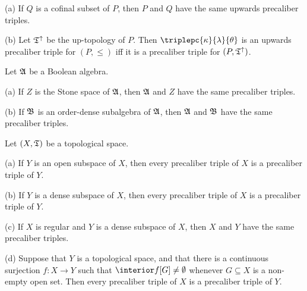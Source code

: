 (a) If $Q$ is a cofinal subset of $P$, then $P$ and $Q$ have the same
upwards precaliber triples.

(b) Let $\frak T^{\uparrow}$ be the up-topology of
$P$.    Then
$\triplepc{\kappa}{\lambda}{\theta}$ is an upwards precaliber triple for
$(P,\le)$ iff it is a precaliber triple for $(P,\frak T^{\uparrow})$.


 Let $\frak A$ be a Boolean algebra.

(a) If $Z$ is the Stone space of $\frak A$, then $\frak A$ and $Z$ have
the same precaliber triples.

(b) If $\frak B$ is an order-dense subalgebra of $\frak A$, then
$\frak A$ and $\frak B$ have the same precaliber triples.


 Let $(X,\frak T)$ be a topological space.

(a) If $Y$ is an open subspace of $X$, then every precaliber triple of
$X$ is a precaliber triple of $Y$.

(b) If $Y$ is a dense subspace of $X$, then every precaliber triple of
$X$ is a precaliber triple of $Y$.

(c) If $X$ is regular and $Y$ is a dense subspace of $X$, then $X$ and
$Y$ have the same precaliber triples.

(d) Suppose that $Y$ is a topological space, and that there is a
continuous surjection $f:X\to Y$ such that $\interior f[G]\ne\emptyset$
whenever $G\subseteq X$ is a non-empty open set.   Then every precaliber
triple of $X$ is a precaliber triple of $Y$.

